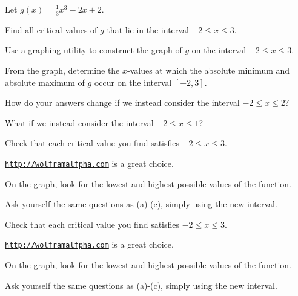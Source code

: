 \begin{activity} \label{A:3.3.1}  Let $g(x) = \frac{1}{3}x^3 - 2x + 2.$
	\ba
	\item Find all critical values of $g$ that lie in the interval $-2 \le x \le 3$.
	\item Use a graphing utility to construct the graph of $g$ on the interval $-2 \le x \le 3$.
	\item From the graph, determine the $x$-values at which the absolute minimum and absolute maximum of $g$ occur on the interval $[-2,3]$.
	\item How do your answers change if we instead consider the interval $-2 \le x \le 2$?
	\item What if we instead consider the interval $-2 \le x \le 1$?
	\ea
\end{activity}
\begin{smallhint}
	\ba
	\item Check that each critical value you find satisfies $-2 \le x \le 3$.
	\item \href{http://wolframalpha.com}{\texttt{http://wolframalfpha.com}} is a great choice.
	\item On the graph, look for the lowest and highest possible values of the function.
	\item Ask yourself the same questions as (a)-(c), simply using the new interval.
	\ea
\end{smallhint}
\begin{bighint}
	\ba
	\item Check that each critical value you find satisfies $-2 \le x \le 3$.
	\item \href{http://wolframalpha.com}{\texttt{http://wolframalfpha.com}} is a great choice.
	\item On the graph, look for the lowest and highest possible values of the function.
	\item Ask yourself the same questions as (a)-(c), simply using the new interval.
	\ea
\end{bighint}
